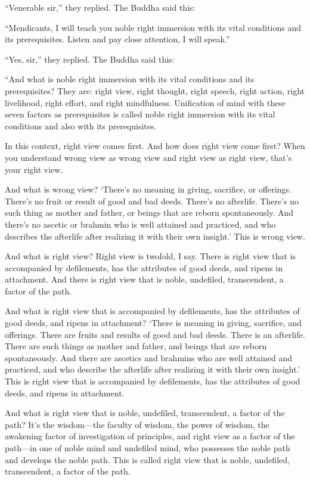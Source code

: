 \documentclass[12pt,openany]{book}%
\begin{document}
“Venerable sir,” they replied. The Buddha said this: 

“Mendicants, I will teach you noble right immersion with its vital conditions and its prerequisites. Listen and pay close attention, I will speak.” 

“Yes, sir,” they replied. The Buddha said this: 

“And what is noble right immersion with its vital conditions and its prerequisites? They are: right view, right thought, right speech, right action, right livelihood, right effort, and right mindfulness. Unification of mind with these seven factors as prerequisites is called noble right immersion with its vital conditions and also with its prerequisites. 

In this context, right view comes first. And how does right view come first? When you understand wrong view as wrong view and right view as right view, that’s your right view. 

And what is wrong view? ‘There’s no meaning in giving, sacrifice, or offerings. There’s no fruit or result of good and bad deeds. There’s no afterlife. There’s no such thing as mother and father, or beings that are reborn spontaneously. And there’s no ascetic or brahmin who is well attained and practiced, and who describes the afterlife after realizing it with their own insight.’ This is wrong view. 

And what is right view? Right view is twofold, I say. There is right view that is accompanied by defilements, has the attributes of good deeds, and ripens in attachment. And there is right view that is noble, undefiled, transcendent, a factor of the path. 

And what is right view that is accompanied by defilements, has the attributes of good deeds, and ripens in attachment? ‘There is meaning in giving, sacrifice, and offerings. There are fruits and results of good and bad deeds. There is an afterlife. There are such things as mother and father, and beings that are reborn spontaneously. And there are ascetics and brahmins who are well attained and practiced, and who describe the afterlife after realizing it with their own insight.’ This is right view that is accompanied by defilements, has the attributes of good deeds, and ripens in attachment. 

And what is right view that is noble, undefiled, transcendent, a factor of the path? It’s the wisdom—the faculty of wisdom, the power of wisdom, the awakening factor of investigation of principles, and right view as a factor of the path—in one of noble mind and undefiled mind, who possesses the noble path and develops the noble path. This is called right view that is noble, undefiled, transcendent, a factor of the path. 
\end{document}
